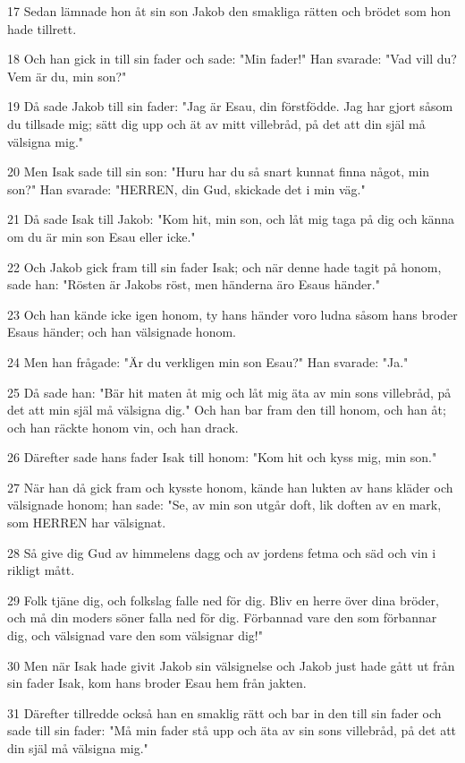 \par 17 Sedan lämnade hon åt sin son Jakob den smakliga rätten och brödet som hon hade tillrett.
\par 18 Och han gick in till sin fader och sade: "Min fader!" Han svarade: "Vad vill du? Vem är du, min son?"
\par 19 Då sade Jakob till sin fader: "Jag är Esau, din förstfödde. Jag har gjort såsom du tillsade mig; sätt dig upp och ät av mitt villebråd, på det att din själ må välsigna mig."
\par 20 Men Isak sade till sin son: "Huru har du så snart kunnat finna något, min son?" Han svarade: "HERREN, din Gud, skickade det i min väg."
\par 21 Då sade Isak till Jakob: "Kom hit, min son, och låt mig taga på dig och känna om du är min son Esau eller icke."
\par 22 Och Jakob gick fram till sin fader Isak; och när denne hade tagit på honom, sade han: "Rösten är Jakobs röst, men händerna äro Esaus händer."
\par 23 Och han kände icke igen honom, ty hans händer voro ludna såsom hans broder Esaus händer; och han välsignade honom.
\par 24 Men han frågade: "Är du verkligen min son Esau?" Han svarade: "Ja."
\par 25 Då sade han: "Bär hit maten åt mig och låt mig äta av min sons villebråd, på det att min själ må välsigna dig." Och han bar fram den till honom, och han åt; och han räckte honom vin, och han drack.
\par 26 Därefter sade hans fader Isak till honom: "Kom hit och kyss mig, min son."
\par 27 När han då gick fram och kysste honom, kände han lukten av hans kläder och välsignade honom; han sade: "Se, av min son utgår doft, lik doften av en mark, som HERREN har välsignat.
\par 28 Så give dig Gud av himmelens dagg och av jordens fetma och säd och vin i rikligt mått.
\par 29 Folk tjäne dig, och folkslag falle ned för dig. Bliv en herre över dina bröder, och må din moders söner falla ned för dig. Förbannad vare den som förbannar dig, och välsignad vare den som välsignar dig!"
\par 30 Men när Isak hade givit Jakob sin välsignelse och Jakob just hade gått ut från sin fader Isak, kom hans broder Esau hem från jakten.
\par 31 Därefter tillredde också han en smaklig rätt och bar in den till sin fader och sade till sin fader: "Må min fader stå upp och äta av sin sons villebråd, på det att din själ må välsigna mig."
